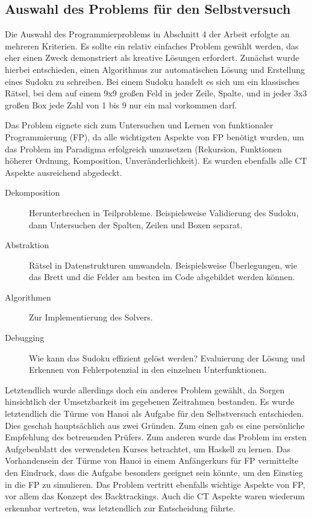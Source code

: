 \subsection{Auswahl des Problems für den Selbstversuch}
Die Auswahl des Programmierproblems in Abschnitt 4 der Arbeit erfolgte an mehreren Kriterien. Es sollte ein relativ einfaches Problem gewählt werden, das eher einen Zweck demonstriert als kreative Lösungen erfordert.
Zunächst wurde hierbei entschieden, einen Algorithmus zur automatischen Lösung und Erstellung eines Sudoku zu schreiben.
Bei einem Sudoku handelt es sich um ein klassisches Rätsel, bei dem auf einem 9x9 großen Feld in jeder Zeile, Spalte, und in jeder 3x3 großen Box jede Zahl von 1 bis 9 nur ein mal vorkommen darf.

Das Problem eignete sich zum Untersuchen und Lernen von funktionaler Programmierung (FP), da alle wichtigsten Aspekte von FP benötigt wurden, um das Problem im Paradigma erfolgreich umzusetzen (Rekursion, Funktionen höherer Ordnung, Komposition, Unveränderlichkeit). Es wurden ebenfalls alle CT Aspekte ausreichend abgedeckt.

\begin{description}
    \item[Dekomposition] Herunterbrechen in Teilprobleme. Beispielsweise Validierung des Sudoku, dann Untersuchen der Spalten, Zeilen und Boxen separat.
    \item[Abstraktion] Rätsel in Datenstrukturen umwandeln. Beispielsweise Überlegungen, wie das Brett und die Felder am besten im Code abgebildet werden können.
    \item[Algorithmen] Zur Implementierung des Solvers.
    \item[Debugging] Wie kann das Sudoku effizient gelöst werden? Evaluierung der Lösung und Erkennen von Fehlerpotenzial in den einzelnen Unterfunktionen.
\end{description}

Letztendlich wurde allerdings doch ein anderes Problem gewählt, da Sorgen hinsichtlich der Umsetzbarkeit im gegebenen Zeitrahmen bestanden.
Es wurde letztendlich die Türme von Hanoi als Aufgabe für den Selbstversuch entschieden. Dies geschah hauptsächlich aus zwei Gründen. Zum einen gab es eine persönliche Empfehlung des betreuenden Prüfers. Zum anderen wurde das Problem im ersten Aufgebenblatt des verwendeten Kurses betrachtet, um Haskell zu lernen. Das Vorhandensein der Türme von Hanoi in einem Anfängerkurs für FP vermittelte den Eindruck, dass die Aufgabe besonders geeignet sein könnte, um den Einstieg in die FP zu simulieren.
Das Problem vertritt ebenfalls wichtige Aspekte von FP, vor allem das Konzept des Backtrackings. Auch die CT Aspekte waren wiederum erkennbar vertreten, was letztendlich zur Entscheidung führte.

